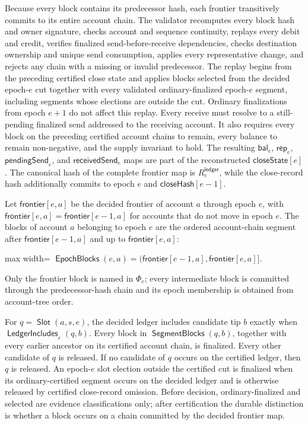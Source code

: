 \documentclass[sigplan,twocolumn,review,anonymous]{acmart}
\newcommand{\func}[1]{\operatorname{\mathsf{#1}}}
\newcommand{\Slot}{\func{Slot}}
\newcommand{\SegmentBlocks}{\func{SegmentBlocks}}
\newcommand{\frontier}{\mathsf{frontier}}
\newcommand{\closeHash}{\mathsf{closeHash}}
\newcommand{\EpochBlocks}{\func{EpochBlocks}}
\newcommand{\closeState}{\mathsf{closeState}}
\newcommand{\bal}{\mathsf{bal}}
\newcommand{\repOf}{\mathsf{rep}}
\newcommand{\pendingSend}{\mathsf{pendingSend}}
\newcommand{\receivedSend}{\mathsf{receivedSend}}
\begin{document}
Because every block contains its predecessor hash, each frontier transitively commits to its entire
account chain.  The validator recomputes every block hash and owner signature, checks account and
sequence continuity, replays every debit and credit, verifies finalized send-before-receive dependencies,
checks destination ownership and unique send consumption, applies every representative change, and
rejects any chain with a missing or invalid predecessor.  The replay begins from the preceding certified close state and applies blocks selected from the decided
epoch-\(e\) cut together with every validated ordinary-finalized epoch-\(e\) segment, including segments
whose elections are outside the cut.  Ordinary finalizations from epoch \(e+1\) do not affect this replay.  Every receive
must resolve to a still-pending finalized send addressed to the receiving account.  It also requires
every block on the preceding certified account chains to remain, every balance to remain non-negative,
and the supply invariant to hold.
The resulting \(\bal_e\), \(\repOf_e\), \(\pendingSend_e\), and \(\receivedSend_e\) maps are part of
the reconstructed \(\closeState[e]\).  The canonical hash of the complete frontier map is
\(R^{\mathsf{ledger}}_e\), while the close-record hash additionally commits to epoch \(e\) and
\(\closeHash[e-1]\).

Let \(\frontier[e,a]\) be the decided frontier of account \(a\) through epoch \(e\), with
\(\frontier[e,a]=\frontier[e-1,a]\) for accounts that do not move in epoch \(e\).  The blocks of
account \(a\) belonging to epoch \(e\) are the ordered account-chain segment after
\(\frontier[e-1,a]\) and up to \(\frontier[e,a]\):
\begin{center}
\begin{adjustbox}{max width=\columnwidth}
\(\displaystyle
\EpochBlocks(e,a)=
(\frontier[e-1,a],\frontier[e,a]] .
\)
\end{adjustbox}
\end{center}
Only the frontier block is named in \(\Phi_e\); every intermediate block is committed through the
predecessor-hash chain and its epoch membership is obtained from account-tree order.

For \(q=\Slot(a,s,e)\), the decided ledger includes candidate tip \(b\) exactly when
\(\func{LedgerIncludes}_e(q,b)\).  Every block in \(\SegmentBlocks(q,b)\), together with every earlier
ancestor on its certified account chain, is finalized.  Every other candidate of \(q\) is released.  If no candidate of \(q\) occurs on the
certified ledger, then \(q\) is released.  An epoch-\(e\) slot election outside the certified cut is
finalized when its ordinary-certified segment occurs on the decided ledger and is otherwise released by
certified close-record omission.  Before decision, ordinary-finalized and selected are evidence
classifications only; after certification the durable distinction is whether a block occurs on a chain
committed by the decided frontier map.
\end{document}
